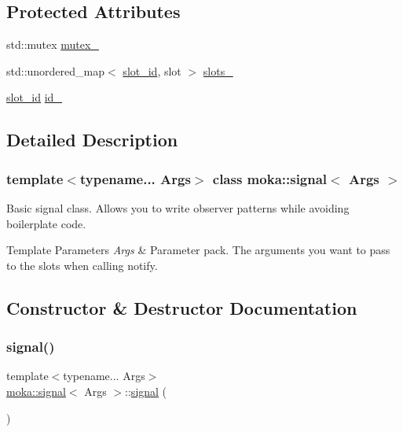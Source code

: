\subsection*{Protected Attributes}
\begin{DoxyCompactItemize}
\item 
std\+::mutex \mbox{\hyperlink{classmoka_1_1signal_ab7a1d48d55a437002b8e7e6cd50c3ea7}{mutex\+\_\+}}
\item 
std\+::unordered\+\_\+map$<$ \mbox{\hyperlink{namespacemoka_a959d3112313fb589684e8b1e3df66385}{slot\+\_\+id}}, slot $>$ \mbox{\hyperlink{classmoka_1_1signal_a786a40361180f9f294b57be412ddaaa9}{slots\+\_\+}}
\item 
\mbox{\hyperlink{namespacemoka_a959d3112313fb589684e8b1e3df66385}{slot\+\_\+id}} \mbox{\hyperlink{classmoka_1_1signal_ab8da1469fee78f6b05bf414685f42912}{id\+\_\+}}
\end{DoxyCompactItemize}


\subsection{Detailed Description}
\subsubsection*{template$<$typename... Args$>$\newline
class moka\+::signal$<$ Args $>$}

Basic signal class. Allows you to write observer patterns while avoiding boilerplate code. 


\begin{DoxyTemplParams}{Template Parameters}
{\em Args} & Parameter pack. The arguments you want to pass to the slots when calling notify. \\
\hline
\end{DoxyTemplParams}


\subsection{Constructor \& Destructor Documentation}
\mbox{\label{classmoka_1_1signal_ad71e1fffe02c33c1b62dd26c60f03577}} 
\subsubsection{\texorpdfstring{signal()}{signal()}}
{\footnotesize\ttfamily template$<$typename... Args$>$ \\
\mbox{\hyperlink{classmoka_1_1signal}{moka\+::signal}}$<$ Args $>$\+::\mbox{\hyperlink{classmoka_1_1signal}{signal}} (\begin{DoxyParamCaption}{ }\end{DoxyParamCaption})}



